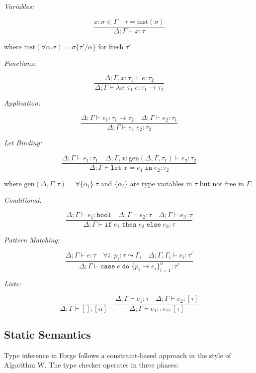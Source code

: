 \documentclass[10pt,letterpaper,twocolumn]{article}
\begin{document}
\textit{Variables:}

$$
\frac{x : \sigma \in \Gamma \quad \tau = \text{inst}(\sigma)}{\Delta; \Gamma \vdash x : \tau}
$$

where $\text{inst}(\forall \alpha.\sigma) = \sigma\{\tau'/\alpha\}$ for fresh $\tau'$.

\textit{Functions:}

$$
\frac{\Delta; \Gamma, x : \tau_1 \vdash e : \tau_2}{\Delta; \Gamma \vdash \lambda x{:}\tau_1 . e : \tau_1 \to \tau_2}
$$

\textit{Application:}

$$
\frac{\Delta; \Gamma \vdash e_1 : \tau_1 \to \tau_2 \quad \Delta; \Gamma \vdash e_2 : \tau_1}{\Delta; \Gamma \vdash e_1\;e_2 : \tau_2}
$$

\textit{Let Binding:}

$$
\frac{\Delta; \Gamma \vdash e_1 : \tau_1 \quad \Delta; \Gamma, x : \text{gen}(\Delta, \Gamma, \tau_1) \vdash e_2 : \tau_2}{\Delta; \Gamma \vdash \texttt{let}\;x = e_1\;\texttt{in}\;e_2 : \tau_2}
$$

where $\text{gen}(\Delta, \Gamma, \tau) = \forall \{\alpha_i\}.\tau$ and $\{\alpha_i\}$ are type variables in $\tau$ but not free in $\Gamma$.

\textit{Conditional:}

$$
\frac{\Delta; \Gamma \vdash e_1 : \texttt{bool} \quad \Delta; \Gamma \vdash e_2 : \tau \quad \Delta; \Gamma \vdash e_3 : \tau}{\Delta; \Gamma \vdash \texttt{if}\;e_1\;\texttt{then}\;e_2\;\texttt{else}\;e_3 : \tau}
$$

\textit{Pattern Matching:}

$$
\frac{\Delta; \Gamma \vdash e : \tau \quad \forall i.\; p_i : \tau \leadsto \Gamma_i \quad \Delta; \Gamma, \Gamma_i \vdash e_i : \tau'}{\Delta; \Gamma \vdash \texttt{case}\;e\;\texttt{do}\;\{p_i \to e_i\}^n_{i=1} : \tau'}
$$

\textit{Lists:}

$$
\frac{}{\Delta; \Gamma \vdash [] : [\alpha]}
\quad
\frac{\Delta; \Gamma \vdash e_1 : \tau \quad \Delta; \Gamma \vdash e_2 : [\tau]}{\Delta; \Gamma \vdash e_1 :: e_2 : [\tau]}
$$

\subsection{Static Semantics}

Type inference in Forge follows a constraint-based approach in the style of Algorithm W. The type checker operates in three phases:
\end{document}
